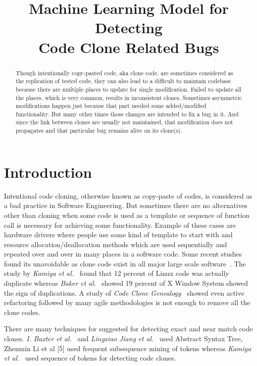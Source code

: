 \documentclass[nocopyrightspace]{sigplanconf}
\title{Machine Learning Model for Detecting \\Code Clone Related Bugs}
\date{}
\begin{document}
\maketitle

\begin{abstract}
Though intentionally copy-pasted code, aka clone code, are sometimes considered as the replication of tested code, they can also lead to a difficult to maintain codebase because there are multiple places to update for single modification. Failed to update all the places, which is very common, results in inconsistent clones. Sometimes asymmetric modifications happen just because that part needed some added/modified functionality. But many other times those changes are intended to fix a bug in it. And since the link between clones are usually not maintained, that modification does not propagates and that particular bug remains alive on its clone(s).
\end{abstract}
			
\section{Introduction}

\vspace{10 pt}
Intentional code cloning, otherwise known as copy-paste of codes, is considered as a bad practice in Software Engineering. But sometimes there are no alternatives other than cloning when some code is used as a template or sequence of function call is necessary for achieving some functionality. Example of these cases are hardware drivers where people use some kind of template to start with and resource allocation/deallocation methods which are used sequentially and repeated over and over in many places in a software code. Some recent studies found its unavoidable as clone code exist in all major large scale software~\cite{Li2006, Kamiya2002,Baker1995}. The study by \emph{Kamiya et al.}~\cite{Kamiya2002} found that 12 percent of Linux code was actually duplicate whereas \emph{Baker et al.}~\cite{Baker1995} showed 19 percent of X Window System showed the sign of duplications. A study of \emph{Code Clone Genealogy}~\cite{Kim2005} showed even active refactoring followed by many agile methodologies is not enough to remove all the clone codes.

\vspace{10 pt}
There are many techniques for suggested for detecting exact and near match code clones. \emph{I. Baxter et al.}~\cite{Baxter1998} and \emph{Lingxiao Jiang et al.}~\cite{Jiang2007} used Abstract Syntax Tree, Zhenmin Li et al [5] used frequent subsequence mining of tokens whereas \emph{Kamiya et al.}~\cite{Kamiya2002} used sequence of tokens for detecting code clones. 
\end{document}
